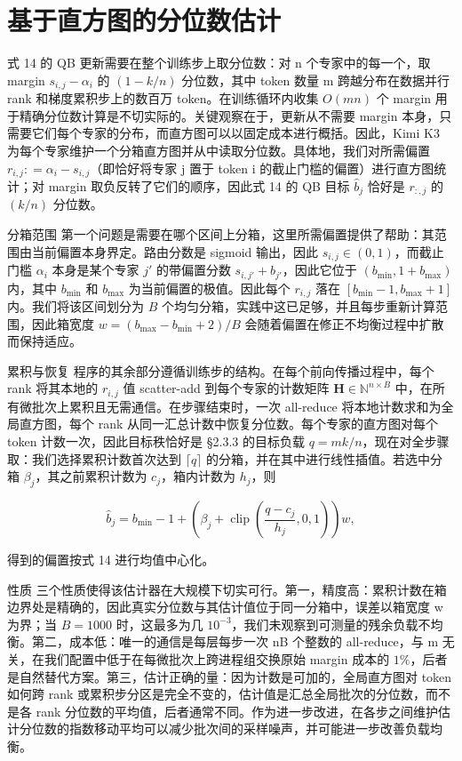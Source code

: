 \section{基于直方图的分位数估计}\label{d-histogram-based-quantile-estimation}

式 14 的 QB 更新需要在整个训练步上取分位数：对 n 个专家中的每一个，取 margin \(s _ { i , j } - \alpha _ { i }\) 的 \(( 1 - k / n )\) 分位数，其中 token 数量 m 跨越分布在数据并行 rank 和梯度累积步上的数百万 token。在训练循环内收集 \(O(mn)\) 个 margin 用于精确分位数计算是不切实际的。关键观察在于，更新从不需要 margin 本身，只需要它们每个专家的分布，而直方图可以以固定成本进行概括。因此，Kimi K3 为每个专家维护一个分箱直方图并从中读取分位数。具体地，我们对所需偏置 \(r _ { i , j } : = \alpha _ { i } - s _ { i , j }\)（即恰好将专家 j 置于 token i 的截止门槛的偏置）进行直方图统计；对 margin 取负反转了它们的顺序，因此式 14 的 QB 目标 \(\widehat { b } _ { j }\) 恰好是 \(r _ { : , j }\) 的 \((k/n)\) 分位数。

分箱范围 第一个问题是需要在哪个区间上分箱，这里所需偏置提供了帮助：其范围由当前偏置本身界定。路由分数是 sigmoid 输出，因此 \(s _ { i , j } \in ( 0 , 1 )\)，而截止门槛 \(\alpha _ { i }\) 本身是某个专家 \(j'\) 的带偏置分数 \(s _ { i , j' } + b _ { j' }\)，因此它位于 \((b_{\min}, 1 + b_{\max})\) 内，其中 \(b_{\min}\) 和 \(b_{\max}\) 为当前偏置的极值。因此每个 \(r_{i,j}\) 落在 \([b_{\min} - 1, b_{\max} + 1]\) 内。我们将该区间划分为 \(B\) 个均匀分箱，实践中这已足够，并且每步重新计算范围，因此箱宽度 \(w = (b_{\max} - b_{\min} + 2) / B\) 会随着偏置在修正不均衡过程中扩散而保持适应。

累积与恢复 程序的其余部分遵循训练步的结构。在每个前向传播过程中，每个 rank 将其本地的 \(r_{i,j}\) 值 scatter-add 到每个专家的计数矩阵 \(\mathbf{H} \in \mathbb{N}^{n \times B}\) 中，在所有微批次上累积且无需通信。在步骤结束时，一次 all-reduce 将本地计数求和为全局直方图，每个 rank 从同一汇总计数中恢复分位数。每个专家的直方图对每个 token 计数一次，因此目标秩恰好是 §2.3.3 的目标负载 \(q = m k / n\)，现在对全步骤取：我们选择累积计数首次达到 \(\lceil q \rceil\) 的分箱，并在其中进行线性插值。若选中分箱 \(\beta_j\)，其之前累积计数为 \(c_j\)，箱内计数为 \(h_j\)，则

\[
\widehat{b}_j = b_{\min} - 1 + \left(\beta_j + \operatorname{clip}\left(\frac{q - c_j}{h_j}, 0, 1\right)\right) w,
\]

得到的偏置按式 14 进行均值中心化。

性质 三个性质使得该估计器在大规模下切实可行。第一，精度高：累积计数在箱边界处是精确的，因此真实分位数与其估计值位于同一分箱中，误差以箱宽度 w 为界；当 \(B = 1000\) 时，这最多为几 \(10^{-3}\)，我们未观察到可测量的残余负载不均衡。第二，成本低：唯一的通信是每层每步一次 nB 个整数的 all-reduce，与 m 无关，在我们配置中低于在每微批次上跨进程组交换原始 margin 成本的 \(1\%\)，后者是自然替代方案。第三，估计正确的量：因为计数是可加的，全局直方图对 token 如何跨 rank 或累积步分区是完全不变的，估计值是汇总全局批次的分位数，而不是各 rank 分位数的平均值，后者通常不同。作为进一步改进，在各步之间维护估计分位数的指数移动平均可以减少批次间的采样噪声，并可能进一步改善负载均衡。

